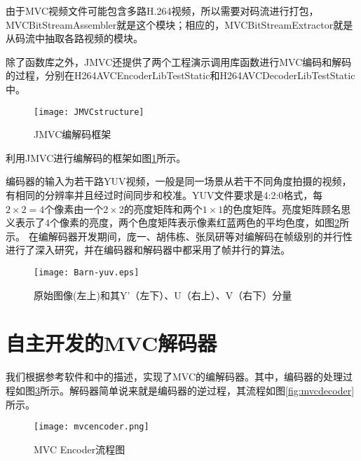 由于MVC视频文件可能包含多路H.264视频，所以需要对码流进行打包，MVCBitStreamAssembler就是这个模块；相应的，MVCBitStreamExtractor就是从码流中抽取各路视频的模块。

除了函数库之外，JMVC还提供了两个工程演示调用库函数进行MVC编码和解码的过程，分别在H264AVCEncoderLibTestStatic和H264AVCDecoderLibTestStatic中。

\begin{figure}[htbp]
\begin{center}
\texttt{[image: JMVCstructure]}
\caption{JMVC编解码框架}
\label{fig:JMVCstructure}
\end{center}
\end{figure}

利用JMVC进行编解码的框架如图\ref{fig:JMVCstructure}所示。

编码器的输入为若干路YUV视频，一般是同一场景从若干不同角度拍摄的视频，有相同的分辨率并且经过时间同步和校准。YUV文件要求是4:2:0格式，每$2\times2=4$个像素由一个$2\times2$的亮度矩阵和两个$1\times1$的色度矩阵。亮度矩阵顾名思义表示了4个像素的亮度，两个色度矩阵表示像素红蓝两色的平均色度，如图\ref{fig:Barn-yuv}所示。
在编解码器开发期间，庞一、胡伟栋、张凤研等对编解码在帧级别的并行性进行了深入研究\cite{pang2009adaptive,yi2008parallelized}，并在编码器和解码器中都采用了帧并行的算法。

\begin{figure}[htbp]
\begin{center}
\texttt{[image: Barn-yuv.eps]}
\caption{原始图像(左上)和其Y'（左下）、U（右上）、V（右下）分量}
\label{fig:Barn-yuv}
\end{center}
\end{figure}

\section{自主开发的MVC解码器}
\label{sec:mvcdecoder}

我们根据参考软件和中的描述，实现了MVC的编解码器。其中，编码器的处理过程如图\ref{fig:mvcencoder}所示。解码器简单说来就是编码器的逆过程，其流程如图\ref{fig:mvcdecoder}所示。

\begin{figure}[htbp]
\begin{center}
\texttt{[image: mvcencoder.png]}
\caption{MVC Encoder流程图}
\label{fig:mvcencoder}
\end{center}
\end{figure}

